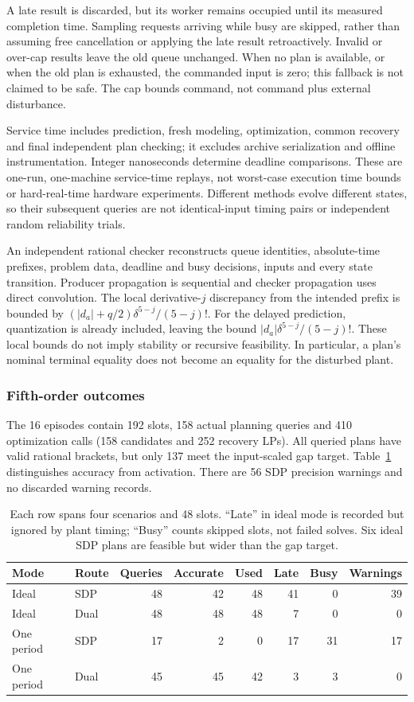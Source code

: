 \documentclass[pdflatex,sn-mathphys-num]{sn-jnl}
\theoremstyle{thmstyleone}
\theoremstyle{thmstyletwo}\newtheorem{remark}[theorem]{Remark}
\begin{document}
A late result is discarded, but its worker remains occupied until its measured
completion time. Sampling requests arriving while busy are skipped, rather
than assuming free cancellation or applying the late result retroactively.
Invalid or over-cap results leave the old queue unchanged. When no plan is
available, or when the old plan is exhausted, the commanded input is zero;
this fallback is not claimed to be safe.
The cap bounds command, not command plus external disturbance.

Service time includes prediction, fresh modeling, optimization, common recovery
and final independent plan checking; it excludes archive serialization and
offline instrumentation. Integer nanoseconds determine deadline comparisons.
These are one-run, one-machine service-time replays, not worst-case execution
time bounds or hard-real-time hardware experiments. Different methods evolve
different states, so their subsequent queries are not identical-input timing
pairs or independent random reliability trials.

An independent rational checker reconstructs queue identities, absolute-time
prefixes, problem data, deadline and busy decisions, inputs and every state
transition. Producer propagation is sequential and checker propagation uses
direct convolution. The local derivative-$j$ discrepancy from the intended
prefix is bounded by $(|d_a|+q/2)\delta^{5-j}/(5-j)!$. For the delayed
prediction, quantization is already included, leaving the bound
$|d_a|\delta^{5-j}/(5-j)!$. These local bounds do not imply stability or
recursive feasibility. In particular, a plan's nominal terminal equality
does not become an equality for the disturbed plant.

\subsubsection{Fifth-order outcomes}
The 16 episodes contain 192 slots, 158 actual planning queries and 410
optimization calls (158 candidates and 252 recovery LPs). All queried plans
have valid rational brackets, but only 137 meet the input-scaled gap target.
Table~\ref{tab:five-feedback-counts} distinguishes accuracy from activation.
There are 56 SDP precision warnings and no discarded warning records.
\begin{table}[htbp]
\centering\small
\caption{Each row spans four scenarios and 48 slots. ``Late'' in ideal mode
is recorded but ignored by plant timing; ``Busy'' counts skipped slots, not
failed solves. Six ideal SDP plans are feasible but wider than the gap target.}
\label{tab:five-feedback-counts}
\begin{tabular}{llrrrrrr}
\toprule
Mode & Route & Queries & Accurate & Used & Late & Busy & Warnings\\
\midrule
Ideal & SDP & 48 & 42 & 48 & 41 & 0 & 39\\
Ideal & Dual & 48 & 48 & 48 & 7 & 0 & 0\\
One period & SDP & 17 & 2 & 0 & 17 & 31 & 17\\
One period & Dual & 45 & 45 & 42 & 3 & 3 & 0\\
\bottomrule
\end{tabular}
\end{table}
\end{document}
